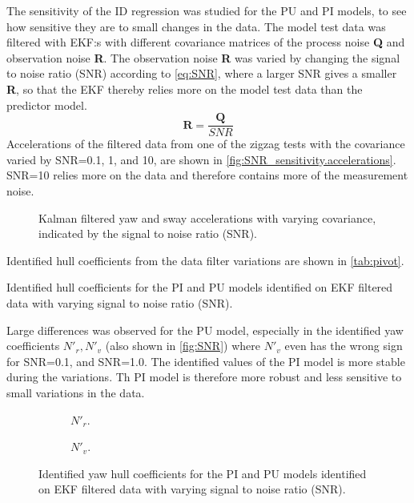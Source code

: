 The sensitivity of the ID regression was studied for the PU and PI models, to see how sensitive they are to small changes in the data.
The model test data was filtered with EKF:s with different covariance matrices of the process noise \textbf{Q} and observation noise \textbf{R}. The observation noise \textbf{R} was varied by changing the signal to noise ratio (SNR) according to \autoref{eq:SNR}, where a larger SNR gives a smaller \textbf{R}, so that the EKF thereby relies more on the model test data than the predictor model.
\begin{equation}
    \label{eq:SNR}
    \mathbf{R} = \frac{\mathbf{Q}}{SNR}
\end{equation}
Accelerations of the filtered data from one of the zigzag tests with the covariance varied by SNR=0.1, 1, and 10, are shown in \autoref{fig:SNR_sensitivity.accelerations}. SNR=10 relies more on the data and therefore contains more of the measurement noise.
\begin{figure}[h]
    \begin{center}
        
        \caption{Kalman filtered yaw and sway accelerations with varying covariance, indicated by the signal to noise ratio (SNR).}
        \label{fig:SNR_sensitivity.accelerations}
    \end{center}
\end{figure}
Identified hull coefficients from the data filter variations are shown in \autoref{tab:pivot}.
\begin{table}[h]
    \centering
    \caption{Identified hull coefficients for the PI and PU models identified on EKF filtered data with varying signal to noise ratio (SNR).}
    \label{tab:pivot}
\end{table}
Large differences was observed for the PU model, especially in the identified yaw coefficients ${N}'_r,{N}'_v$ (also shown in \autoref{fig:SNR}) where ${N}'_v$ even has the wrong sign for SNR=0.1, and SNR=1.0. The identified values of the PI model is more stable during the variations. Th PI model is therefore more robust and less sensitive to small variations in the data.
\begin{figure}
    \centering
    \begin{subfigure}[b]{0.49\textwidth}
        \centering
        
        \caption{${N}'_r$.}
        \label{fig:SNR_sensitivity.Nr}
    \end{subfigure}
    \vfill
    \begin{subfigure}[b]{0.49\textwidth}
        \centering
        
        \caption{${N}'_v$.}
        \label{fig:SNR_sensitivity.Nv}
    \end{subfigure}
    
    \caption{Identified yaw hull coefficients for the PI and PU models identified on EKF filtered
data with varying signal to noise ratio (SNR).}
    \label{fig:SNR}
\end{figure}